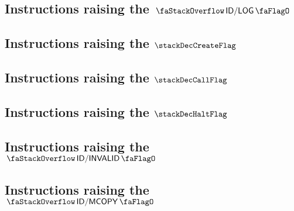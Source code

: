 \subsection{Instructions raising the $\stackDecLogFlag$           \lispDone{}}   \label{hub: instruction handling: log}                    
\subsection{Instructions raising the $\stackDecCreateFlag$        \lispDone{}}   \label{hub: instruction handling: create}                 
\subsection{Instructions raising the $\stackDecCallFlag$          \lispDone{}}   \label{hub: instruction handling: call}                   
\subsection{Instructions raising the $\stackDecHaltFlag$          \lispDone{}}   \label{hub: instruction handling: halt}                   
\subsection{Instructions raising the $\stackDecInvalidFlag$       \lispDone{}}   \label{hub: instruction handling: invalid}                
\subsection{Instructions raising the $\stackDecMcopyFlag$         \lispDone{}}   \label{hub: instruction handling: mcopy}                  
